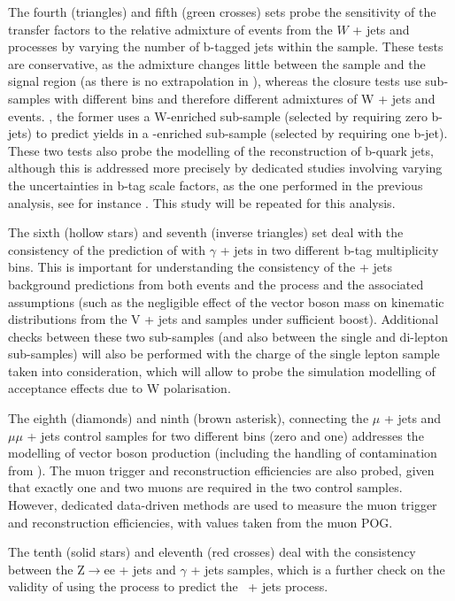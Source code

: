 The fourth (triangles) and fifth (green crosses) sets probe the
sensitivity of the transfer factors to the relative admixture of
events from the $W$ + jets and \ttbar processes by varying the number
of b-tagged jets within the \mj sample. These tests are conservative,
as the admixture changes little between the \mj sample and the signal
region (as there is no extrapolation in \nb), whereas the closure
tests use sub-samples with different \nb bins and therefore different
admixtures of W + jets and \ttbar events. \eg, the former uses a
W-enriched sub-sample (selected by requiring zero b-jets) to predict
yields in a \ttbar-enriched sub-sample (selected by requiring one
b-jet).  These two tests also probe the modelling of the
reconstruction of b-quark jets, although this is addressed more
precisely by dedicated studies involving varying the uncertainties in
b-tag scale factors, as the one performed in the previous analysis,
see for instance \cite{CMS_AN_2013-366}. This study will be repeated
for this analysis.

The sixth (hollow stars) and seventh (inverse triangles) set deal with
the consistency of the prediction of \wej with $\gamma$ + jets in two
different b-tag multiplicity bins. This is important for understanding
the consistency of the \znunu + jets background predictions from both
\wej events and the \gj process and the associated assumptions (such
as the negligible effect of the vector boson mass on kinematic
distributions from the V + jets and \gj samples under sufficient
boost). Additional checks between these two sub-samples (and also
between the single and di-lepton sub-samples) will also be performed
with the charge of the single lepton sample taken into consideration,
which will allow to probe the simulation modelling of acceptance
effects due to W polarisation.

The eighth (diamonds) and ninth (brown asterisk), connecting the $\mu$
+ jets and $\mu\mu$ + jets control samples for two different \nb bins
(zero and one) addresses the modelling of vector boson production
(including the handling of contamination from \ttbar). The muon
trigger and reconstruction efficiencies are also probed, given that
exactly one and two muons are required in the two control
samples. However, dedicated data-driven methods are used to measure
the muon trigger and reconstruction efficiencies, with values taken
from the muon POG.

The tenth (solid stars) and eleventh (red crosses) deal with the
consistency between the Z$\rightarrow$ee + jets and $\gamma$ + jets
samples, which is a further check on the validity of using the \gj
process to predict the \znunu\, + jets process.

